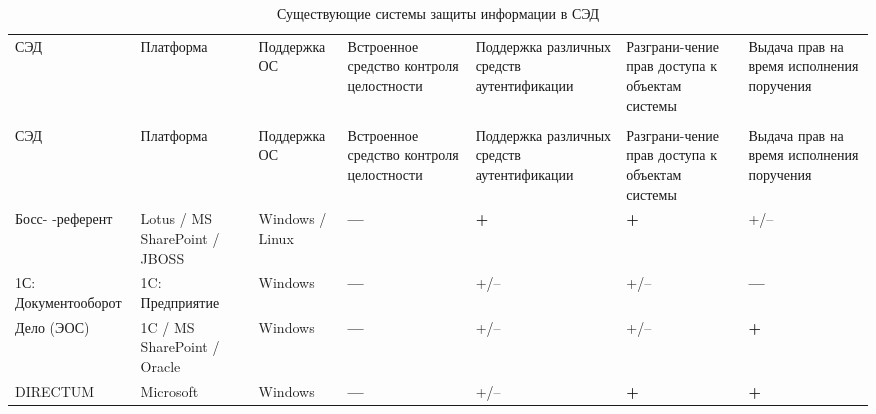  \begin{center}
 \renewcommand\multirowsetup{\centering}
 \begin{longtable}[h]{| >{\centering}m{2.5cm} | >{\centering}m{2cm} | >{\centering}m{2cm} | >{\centering}m{2cm} | >{\centering}m{2cm} | >{\centering}m{2cm} | >{\centering}m{2cm} |}
  \captionsetup{justification=raggedright}
  \caption{Существующие системы защиты информации в СЭД} \label{table:products} \tabularnewline
  \hline

 \rowcolor{Gray} СЭД   & Платформа & Поддержка ОС & Встроенное средство контроля целостности & Поддержка различных средств аутентификации & Разграни-чение прав доступа к объектам системы & Выдача прав на время исполнения поручения \tabularnewline \hline \endfirsthead   \hline
 \multicolumn{7}{|c|}{\small\slshape (продолжение таблицы \ref{table:products})}        \tabularnewline \hline
\rowcolor{Gray} СЭД   & Платформа & Поддержка ОС & Встроенное средство контроля целостности & Поддержка различных средств аутентификации & Разграни-чение прав доступа к объектам системы & Выдача прав на время исполнения поручения \tabularnewline \hline
                                              \endhead        \hline
                                              \endfoot        \hline
                                              \endlastfoot

  Босс- -референт & \color{Green} Lotus / MS SharePoint / JBOSS & \color{Green} Windows / Linux & \color{Red} \textbf{---} &  \color{Green} \textbf{+} & \color{Green} \textbf{+} & +/-- \tabularnewline \hline

  1С: Документооборот & \color{Red} 1C: Предприятие & \color{Red} Windows & \color{Red} \textbf{---} & +/-- & +/-- & \color{Red} \textbf{---} \tabularnewline \hline




  Дело (ЭОС) & \color{Green} 1C / MS SharePoint / Oracle & \color{Red} Windows & \color{Red} \textbf{---} & +/--  & +/-- & \color{Green} \textbf{+} \tabularnewline \hline

  DIRECTUM & \color{Red} Microsoft & \color{Red} Windows  & \color{Red} \textbf{---} & +/-- & \color{Green} \textbf{+} & \color{Green} \textbf{+} \tabularnewline \hline


\end{longtable}
\end{center}
